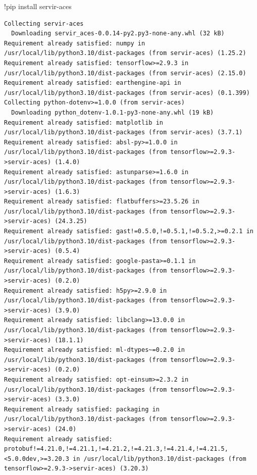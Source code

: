 \documentclass[
  letterpaper,
  DIV=11,
  numbers=noendperiod]{scrreprt}
\newenvironment{Shaded}{\begin{snugshade}}{\end{snugshade}}
\newcommand{\NormalTok}[1]{\textcolor[rgb]{0.00,0.23,0.31}{#1}}
\newcommand{\OperatorTok}[1]{\textcolor[rgb]{0.37,0.37,0.37}{#1}}
\begin{document}
\begin{Shaded}
\begin{Highlighting}[]
\OperatorTok{!}\NormalTok{pip install servir}\OperatorTok{{-}}\NormalTok{aces}
\end{Highlighting}
\end{Shaded}

\begin{verbatim}
Collecting servir-aces
  Downloading servir_aces-0.0.14-py2.py3-none-any.whl (32 kB)
Requirement already satisfied: numpy in /usr/local/lib/python3.10/dist-packages (from servir-aces) (1.25.2)
Requirement already satisfied: tensorflow>=2.9.3 in /usr/local/lib/python3.10/dist-packages (from servir-aces) (2.15.0)
Requirement already satisfied: earthengine-api in /usr/local/lib/python3.10/dist-packages (from servir-aces) (0.1.399)
Collecting python-dotenv>=1.0.0 (from servir-aces)
  Downloading python_dotenv-1.0.1-py3-none-any.whl (19 kB)
Requirement already satisfied: matplotlib in /usr/local/lib/python3.10/dist-packages (from servir-aces) (3.7.1)
Requirement already satisfied: absl-py>=1.0.0 in /usr/local/lib/python3.10/dist-packages (from tensorflow>=2.9.3->servir-aces) (1.4.0)
Requirement already satisfied: astunparse>=1.6.0 in /usr/local/lib/python3.10/dist-packages (from tensorflow>=2.9.3->servir-aces) (1.6.3)
Requirement already satisfied: flatbuffers>=23.5.26 in /usr/local/lib/python3.10/dist-packages (from tensorflow>=2.9.3->servir-aces) (24.3.25)
Requirement already satisfied: gast!=0.5.0,!=0.5.1,!=0.5.2,>=0.2.1 in /usr/local/lib/python3.10/dist-packages (from tensorflow>=2.9.3->servir-aces) (0.5.4)
Requirement already satisfied: google-pasta>=0.1.1 in /usr/local/lib/python3.10/dist-packages (from tensorflow>=2.9.3->servir-aces) (0.2.0)
Requirement already satisfied: h5py>=2.9.0 in /usr/local/lib/python3.10/dist-packages (from tensorflow>=2.9.3->servir-aces) (3.9.0)
Requirement already satisfied: libclang>=13.0.0 in /usr/local/lib/python3.10/dist-packages (from tensorflow>=2.9.3->servir-aces) (18.1.1)
Requirement already satisfied: ml-dtypes~=0.2.0 in /usr/local/lib/python3.10/dist-packages (from tensorflow>=2.9.3->servir-aces) (0.2.0)
Requirement already satisfied: opt-einsum>=2.3.2 in /usr/local/lib/python3.10/dist-packages (from tensorflow>=2.9.3->servir-aces) (3.3.0)
Requirement already satisfied: packaging in /usr/local/lib/python3.10/dist-packages (from tensorflow>=2.9.3->servir-aces) (24.0)
Requirement already satisfied: protobuf!=4.21.0,!=4.21.1,!=4.21.2,!=4.21.3,!=4.21.4,!=4.21.5,<5.0.0dev,>=3.20.3 in /usr/local/lib/python3.10/dist-packages (from tensorflow>=2.9.3->servir-aces) (3.20.3)

\end{verbatim}
\end{document}
